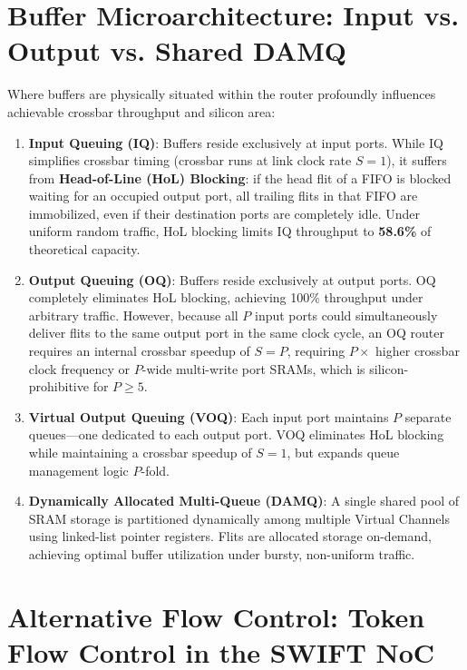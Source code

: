 \section{Buffer Microarchitecture: Input vs. Output vs. Shared DAMQ}
\label{sec:ch2_buffer_org}

Where buffers are physically situated within the router profoundly influences achievable crossbar throughput and silicon area:

\begin{enumerate}
    \item \textbf{Input Queuing (IQ)}: Buffers reside exclusively at input ports. While IQ simplifies crossbar timing (crossbar runs at link clock rate $S=1$), it suffers from \textbf{Head-of-Line (HoL) Blocking}: if the head flit of a FIFO is blocked waiting for an occupied output port, all trailing flits in that FIFO are immobilized, even if their destination ports are completely idle. Under uniform random traffic, HoL blocking limits IQ throughput to \textbf{58.6\%} of theoretical capacity.
    \item \textbf{Output Queuing (OQ)}: Buffers reside exclusively at output ports. OQ completely eliminates HoL blocking, achieving 100\% throughput under arbitrary traffic. However, because all $P$ input ports could simultaneously deliver flits to the same output port in the same clock cycle, an OQ router requires an internal crossbar speedup of $S = P$, requiring $P \times$ higher crossbar clock frequency or $P$-wide multi-write port SRAMs, which is silicon-prohibitive for $P \ge 5$.
    \item \textbf{Virtual Output Queuing (VOQ)}: Each input port maintains $P$ separate queues—one dedicated to each output port. VOQ eliminates HoL blocking while maintaining a crossbar speedup of $S=1$, but expands queue management logic $P$-fold.
    \item \textbf{Dynamically Allocated Multi-Queue (DAMQ)}: A single shared pool of SRAM storage is partitioned dynamically among multiple Virtual Channels using linked-list pointer registers. Flits are allocated storage on-demand, achieving optimal buffer utilization under bursty, non-uniform traffic.
\end{enumerate}

\section{Alternative Flow Control: Token Flow Control in the SWIFT NoC}
\label{sec:ch2_swift_token}

